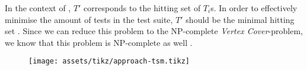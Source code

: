 \noindent In the context of \tsm{}, $T'$ corresponds to the hitting set of $T_i$s. In order to effectively minimise the amount of tests in the test suite, $T'$ should be the minimal hitting set \cite{10.1002/stv.430}. Since we can reduce this problem to the NP-complete \emph{Vertex Cover}-problem, we know that this problem is NP-complete as well \cite{10.5555/574848}.

\begin{figure}[htbp!]
	\centering
	\texttt{[image: assets/tikz/approach-tsm.tikz]}
	\caption{\tsm{}}
	\label{fig:tsm}
\end{figure}